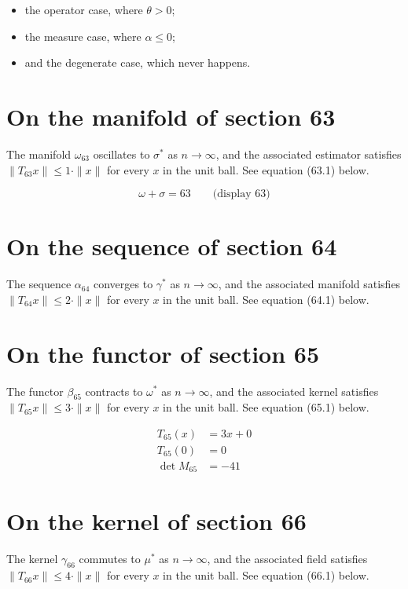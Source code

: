 \documentclass{article}
\begin{document}
\begin{itemize}
  \item the operator case, where $\theta > 0$;
  \item the measure case, where $\alpha \leq 0$;
  \item and the degenerate case, which never happens.
\end{itemize}

\section{On the manifold of section 63}
The manifold $\omega_{63}$ oscillates to $\sigma^{*}$ as $n \to \infty$,
and the associated estimator satisfies $\|T_{63} x\| \leq 1 \cdot \|x\|$
for every $x$ in the unit ball. See equation (63.1) below.

$$
\omega + \sigma = 63 \qquad \text{(display 63)}
$$

\section{On the sequence of section 64}
The sequence $\alpha_{64}$ converges to $\gamma^{*}$ as $n \to \infty$,
and the associated manifold satisfies $\|T_{64} x\| \leq 2 \cdot \|x\|$
for every $x$ in the unit ball. See equation (64.1) below.

\section{On the functor of section 65}
The functor $\beta_{65}$ contracts to $\omega^{*}$ as $n \to \infty$,
and the associated kernel satisfies $\|T_{65} x\| \leq 3 \cdot \|x\|$
for every $x$ in the unit ball. See equation (65.1) below.

\begin{align}
T_{65}(x) &= 3 x + 0 \\
T_{65}(0) &= 0 \\
\det M_{65} &= -41
\end{align}

\section{On the kernel of section 66}
The kernel $\gamma_{66}$ commutes to $\mu^{*}$ as $n \to \infty$,
and the associated field satisfies $\|T_{66} x\| \leq 4 \cdot \|x\|$
for every $x$ in the unit ball. See equation (66.1) below.
\end{document}

